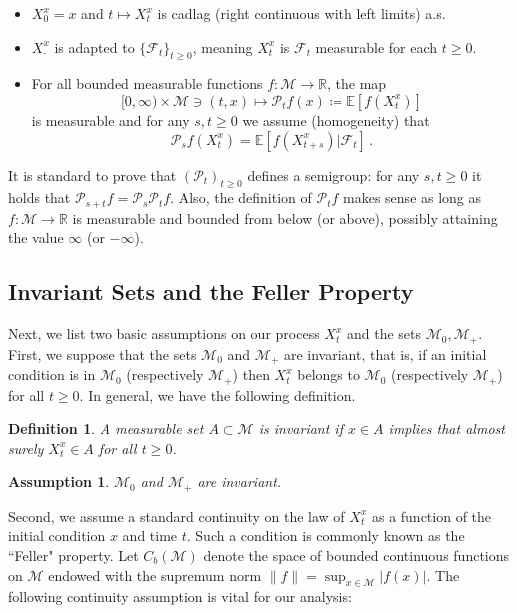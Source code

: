 \documentclass[final]{amsart}
\newtheorem{ass}{Assumption}[]
\newtheorem{deff}[thm]{Definition}
\numberwithin{thm}{section}
\numberwithin{equation}{section}
\newcommand{\E}{\mathbb{E}}
\newcommand{\mcM}{\mathcal{M}}
\newcommand{\Pp}{\mathcal{P}}
\newcommand{\R}{\mathbb{R}}
\newcommand{\inv}{\mathcal{M}_+}
\begin{document}
\begin{itemize}
    \item $X_0^x = x$ and $t \mapsto X_t^x$ is cadlag (right continuous with left limits) a.s.
    \item $X^x_\cdot$ is adapted to $\{\mathcal{F}_t\}_{t \geq 0}$, meaning $X_t^x$ is $\mathcal{F}_t$ measurable for each $t \geq 0$.
    \item \label{semigroup} For all bounded measurable functions $f:\mcM \to \mathbb{R}$, the map
    $$
    [0,\infty) \times \mcM \ni (t,x) \mapsto \Pp_t f(x) \coloneqq \E[f(X_t^x)] 
    $$ 
    is measurable and for any $s, t \geq 0$ we assume (homogeneity)
    that
    $$
    \Pp_s f(X_t^x) = \E[f(X_{t + s}^x)|\mathcal{F}_t] \,.
    $$    
\end{itemize}

It is standard to prove that $(\mathcal{P}_t)_{t \geq 0}$ defines 
a semigroup: for any $s, t \geq 0$ it holds that $\Pp_{s+t}f = \Pp_s \Pp_tf$. Also, the definition of $\Pp_tf$ makes sense as long as $f: \mcM \to \R$ is measurable and bounded from below (or above), possibly attaining the value $\infty$ (or $-\infty$). 


\subsection{Invariant Sets and the Feller Property }
Next, we list two basic assumptions on our process $X_t^x$ and the sets $\mcM_0, \inv$. First, we suppose that the sets $\mcM_0$ and $\inv$ are invariant, that is, 
if an initial condition is in $\mcM_0$ (respectively $\inv$) then $X_t^x$ belongs to $\mcM_0$ (respectively $\inv$) for all $t \geq 0$. 
In general, we have the following definition. 


\begin{deff}
\label{inv-set}
    A measurable set $A \subset \mcM$ is invariant if $x \in A$ implies that almost surely $X_t^x \in A$ for all $t \geq 0$.
\end{deff}

\begin{ass} \label{as1}
    $\mcM_0$ and $\mcM_+$ are invariant.
\end{ass}

Second, we assume a standard continuity on the law of $X_t^x$ as a function of the initial condition $x$ and time $t$. Such a condition is commonly known as the ``Feller" property.
Let $C_b(\mcM)$ denote the space of bounded continuous functions on $\mcM$ endowed with the supremum norm $\|f\| = \sup_{x \in \mcM} |f(x)|$. The following continuity assumption is vital for our analysis:
\end{document}
